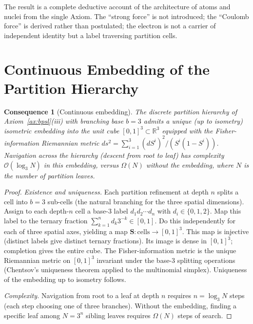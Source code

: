\documentclass[11pt,twocolumn,a4paper]{article}
\theoremstyle{axiomstyle}
\theoremstyle{conseqstyle}
\newtheorem{consequence}{Consequence}
\theoremstyle{definition}
\theoremstyle{remark}
\newcommand{\Real}{\mathbb{R}}
\begin{document}
The result is a complete deductive account of the architecture of atoms and nuclei from the single Axiom. The ``strong force'' is not introduced; the ``Coulomb force'' is derived rather than postulated; the electron is not a carrier of independent identity but a label traversing partition cells.

\section{Continuous Embedding of the Partition Hierarchy}
\label{sec:continuousemb}

\begin{consequence}[Continuous embedding]
\label{cons:continuousembed}
The discrete partition hierarchy of Axiom~\ref{ax:bpsl}(iii) with branching base $b=3$ admits a unique (up to isometry) isometric embedding into the unit cube $[0,1]^{3}\subset\Real^{3}$ equipped with the Fisher-information Riemannian metric $ds^{2}=\sum_{i=1}^{3}(dS^{i})^{2}/(S^{i}(1-S^{i}))$. Navigation across the hierarchy (descent from root to leaf) has complexity $\mathcal{O}(\log_{3}N)$ in this embedding, versus $\Omega(N)$ without the embedding, where $N$ is the number of partition leaves.
\end{consequence}

\begin{proof}
\emph{Existence and uniqueness.} Each partition refinement at depth $n$ splits a cell into $b=3$ sub-cells (the natural branching for the three spatial dimensions). Assign to each depth-$n$ cell a base-3 label $d_{1}d_{2}\cdots d_{n}$ with $d_{i}\in\{0,1,2\}$. Map this label to the ternary fraction $\sum_{k=1}^{n}d_{k}3^{-k}\in[0,1]$. Do this independently for each of three spatial axes, yielding a map $\mathbf{S}\colon\mathrm{cells}\to[0,1]^{3}$. This map is injective (distinct labels give distinct ternary fractions). Its image is dense in $[0,1]^{3}$; completion gives the entire cube. The Fisher-information metric is the unique Riemannian metric on $[0,1]^{3}$ invariant under the base-3 splitting operations (Chentsov's uniqueness theorem applied to the multinomial simplex). Uniqueness of the embedding up to isometry follows.

\emph{Complexity.} Navigation from root to a leaf at depth $n$ requires $n=\log_{3}N$ steps (each step choosing one of three branches). Without the embedding, finding a specific leaf among $N=3^{n}$ sibling leaves requires $\Omega(N)$ steps of search.
\end{proof}
\end{document}
